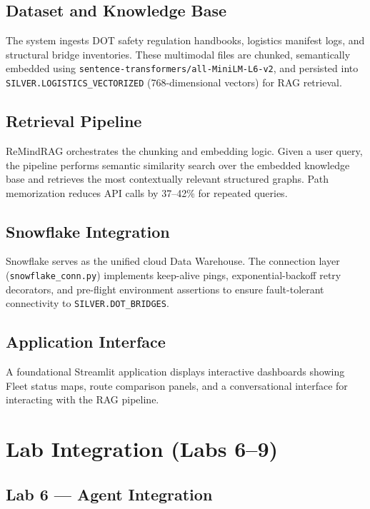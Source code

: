 \documentclass[11pt,letterpaper]{article}
\begin{document}
\subsection{Dataset and Knowledge Base}
The system ingests DOT safety regulation handbooks, logistics manifest logs, and structural bridge inventories. These multimodal files are chunked, semantically embedded using \texttt{sentence-transformers/all-MiniLM-L6-v2}, and persisted into \texttt{SILVER.LOGISTICS\_VECTORIZED} (768-dimensional vectors) for RAG retrieval.

\subsection{Retrieval Pipeline}
ReMindRAG orchestrates the chunking and embedding logic. Given a user query, the pipeline performs semantic similarity search over the embedded knowledge base and retrieves the most contextually relevant structured graphs. Path memorization reduces API calls by 37--42\% for repeated queries.

\subsection{Snowflake Integration}
Snowflake serves as the unified cloud Data Warehouse. The connection layer (\texttt{snowflake\_conn.py}) implements keep-alive pings, exponential-backoff retry decorators, and pre-flight environment assertions to ensure fault-tolerant connectivity to \texttt{SILVER.DOT\_BRIDGES}.

\subsection{Application Interface}
A foundational Streamlit application displays interactive dashboards showing Fleet status maps, route comparison panels, and a conversational interface for interacting with the RAG pipeline.

\section{Lab Integration (Labs 6--9)}

\subsection{Lab 6 --- Agent Integration}
\end{document}
